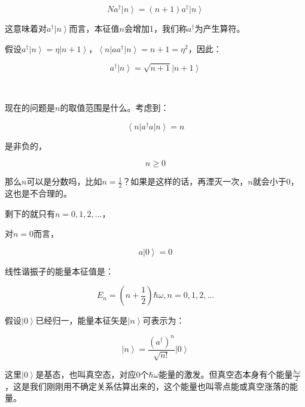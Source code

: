 \begin{equation}
N a^\dagger \left| n \right\rangle = (n +1) a^\dagger \left| n \right\rangle
\end{equation}

这意味着对$a^\dagger \left| n \right\rangle$而言，本征值$n$会增加1，我们称$a^\dagger$为产生算符。

假设$a^\dagger \left| n \right\rangle = \eta \left| n+1 \right\rangle$，$\left\langle n \right| a a^\dagger \left| n \right\rangle = n + 1 = \eta^2 $，因此：

\begin{equation}
a^\dagger \left| n \right\rangle = \sqrt{n + 1} \left| n+1 \right\rangle 
\end{equation}

~

现在的问题是$n$的取值范围是什么。考虑到：

\begin{equation}
\left\langle n \right| a^\dagger a \left| n \right\rangle = n
\end{equation}

是非负的，

\begin{equation}
n \ge 0
\end{equation}

那么$n$可以是分数吗，比如$n = \frac{1}{2}$？如果是这样的话，再湮灭一次，$n$就会小于0，这也是不合理的。

剩下的就只有$n = 0, 1, 2, ...$，

对$n = 0$而言，

\begin{equation}
a \left| 0 \right\rangle = 0
\end{equation}

线性谐振子的能量本征值是：

\begin{equation}
E_n = \left( n + \frac{1}{2} \right) \hbar \omega, n = 0, 1, 2, ...
\end{equation}

假设$\left| 0 \right\rangle$已经归一，能量本征矢是$\left| n \right\rangle$可表示为：

\begin{equation}
\left| n \right\rangle = \frac{ \left( a^\dagger \right)^n }{\sqrt{n !}} \left| 0 \right\rangle
\end{equation}

这里$\left| 0 \right\rangle$是基态，也叫真空态，对应0个$\hbar \omega$能量的激发。但真空态本身有个能量$\frac{\hbar \omega}{2}$，这是我们刚刚用不确定关系估算出来的，这个能量也叫零点能或真空涨落的能量。

